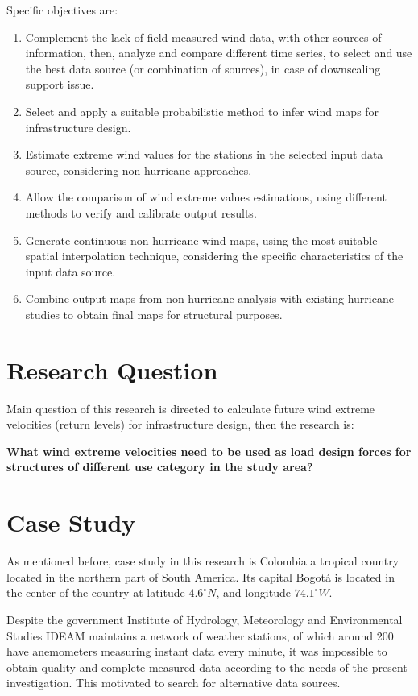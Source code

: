 \documentclass[12pt,oneside]{reedthesis}
\begin{document}
Specific objectives are:
\begin{enumerate}
\def\labelenumi{\arabic{enumi}.}
\item
  Complement the lack of field measured wind data, with other sources of information, then, analyze and compare different time series, to select and use the best data source (or combination of sources), in case of downscaling support issue.
\item
  Select and apply a suitable probabilistic method to infer wind maps for infrastructure design.
\item
  Estimate extreme wind values for the stations in the selected input data source, considering non-hurricane approaches.
\item
  Allow the comparison of wind extreme values estimations, using different methods to verify and calibrate output results.
\item
  Generate continuous non-hurricane wind maps, using the most suitable spatial interpolation technique, considering the specific characteristics of the input data source.
\item
  Combine output maps from non-hurricane analysis with existing hurricane studies to obtain final maps for structural purposes.
\end{enumerate}
\hypertarget{research-question}{%
\section{Research Question}\label{research-question}}

Main question of this research is directed to calculate future wind extreme velocities (return levels) for infrastructure design, then the research is:

\textbf{What wind extreme velocities need to be used as load design forces for structures of different use category in the study area?}

\hypertarget{case-study}{%
\section{Case Study}\label{case-study}}

As mentioned before, case study in this research is Colombia a tropical country located in the northern part of South America. Its capital Bogotá is located in the center of the country at latitude \(4.6^\circ N\), and longitude \(74.1^\circ W\).

Despite the government Institute of Hydrology, Meteorology and Environmental Studies IDEAM maintains a network of weather stations, of which around 200 have anemometers measuring instant data every minute, it was impossible to obtain quality and complete measured data according to the needs of the present investigation. This motivated to search for alternative data sources.
\end{document}
